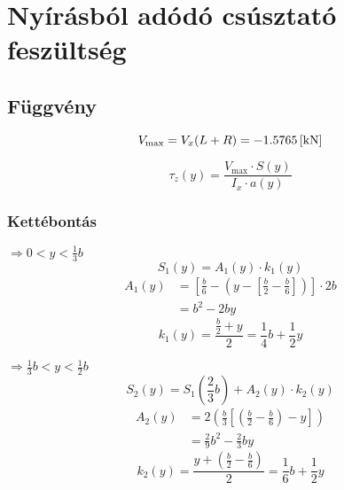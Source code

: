 \section{Nyírásból adódó csúsztató feszültség}

\subsection{Függvény}

\begin{equation*}
	V_\text{max} = V_x (L+R) = \SI{-1.5765}{[\kilo\newton]}
\end{equation*}

\begin{equation*}
	\tau_z(y) = \frac{V_\text{max} \cdot S(y)}{I_x \cdot a(y)}
\end{equation*}

\subsubsection{Kettébontás}

\begin{multicols}{2}
	 $\Rightarrow 0 < y < \frac{1}{3}b$
	\begin{equation*}
		S_1(y) = A_1(y) \cdot k_1(y)
	\end{equation*}
	\begin{align*}
		A_1(y) &= \left[ 
			\frac{b}{6} 
			- \left(y - \left[\frac{b}{2} - \frac{b}{6} \right] \right)
		\right] \cdot 2b
		\\&= b^2 -2by
	\end{align*}
	\begin{equation*}
		k_1(y) = \frac{\frac{b}{2} + y}{2} = \frac{1}{4}b+\frac{1}{2}y
	\end{equation*}

	\columnbreak
	 $\Rightarrow \frac{1}{3}b < y < \frac{1}{2}b$
	\begin{equation*}
		S_2(y) = S_1\left(\frac{2}{3}b\right) + A_2(y) \cdot k_2(y)
	\end{equation*}
	\begin{align*}
		A_2(y) &= 2\left(\frac{b}{3} \left[\left(\frac{b}{2} - \frac{b}{6}\right) - y \right] \right)
		     \\&=\frac{2}{9}b^2 - \frac{2}{3}by
	\end{align*}
	\begin{equation*}
		k_2(y) = \frac{y + \left(\frac{b}{2} - \frac{b}{6} \right)}{2}
		= \frac{1}{6}b + \frac{1}{2}y
	\end{equation*}

\end{multicols}


